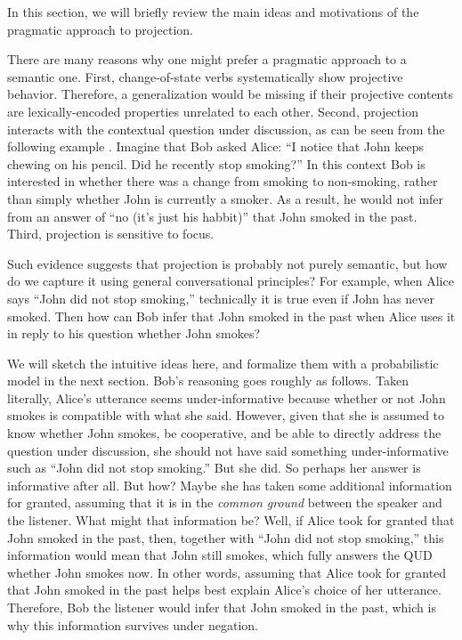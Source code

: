 
In this section, we will briefly review the main ideas and motivations of the
 pragmatic approach to projection.

There are many reasons why one might prefer a pragmatic approach to a 
 semantic one. 
First, change-of-state verbs systematically show projective behavior. 
Therefore, a generalization would be missing if their projective contents are
 lexically-encoded properties unrelated to each other.
Second, projection interacts with the contextual question under discussion,
 as can be seen from the following example \cite{Geurts1995:Presupposing}.
Imagine that Bob asked Alice: ``I notice that John keeps chewing on his pencil. Did he recently stop smoking?''
In this context Bob is interested in whether there was a change from smoking to non-smoking, rather than simply whether John is currently a smoker. 
As a result, he would not infer from an answer of ``no (it's just his habbit)'' that 
 John smoked in the past. 
Third, projection is sensitive to focus.

Such evidence suggests that projection is probably not purely semantic, but how do we 
 capture it using general conversational principles?
For example, when Alice says ``John did not stop smoking,'' technically it is true 
 even if John has never smoked. 
Then how can Bob infer that John smoked in the past when Alice uses it in reply to his question whether John smokes?

We will sketch the intuitive ideas here, and formalize them with a probabilistic model in the next section. 
Bob's reasoning goes roughly as follows. 
Taken literally, Alice's utterance seems under-informative because whether or not
 John smokes is compatible with what she said.
However, given that she is assumed to know whether John smokes, be cooperative, and
 be able to directly address the question under discussion, 
 she should not have said something under-informative such as ``John did not stop smoking.''
But she did. 
So perhaps her answer is informative after all.
But how?
Maybe she has taken some additional information for granted, assuming that it is in 
 the \emph{common ground} between the speaker and the listener.
What might that information be?
Well, if Alice took for granted that John smoked in the past, then, 
  together with ``John did not stop smoking,'' this information would mean that 
 John still smokes, which fully answers the QUD whether John smokes now.
In other words, assuming that Alice took for granted that John smoked in the past 
 helps best explain Alice's choice of her utterance. 
Therefore, Bob the listener would infer that John smoked in the past, which is why 
 this information survives under negation.
